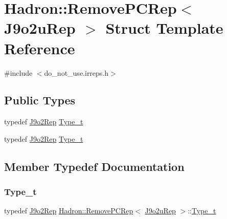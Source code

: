 \hypertarget{structHadron_1_1RemovePCRep_3_01J9o2uRep_01_4}{}\section{Hadron\+:\+:Remove\+P\+C\+Rep$<$ J9o2u\+Rep $>$ Struct Template Reference}
\label{structHadron_1_1RemovePCRep_3_01J9o2uRep_01_4}


{\ttfamily \#include $<$do\+\_\+not\+\_\+use.\+irreps.\+h$>$}

\subsection*{Public Types}
\begin{DoxyCompactItemize}
\item 
typedef \mbox{\hyperlink{structHadron_1_1J9o2Rep}{J9o2\+Rep}} \mbox{\hyperlink{structHadron_1_1RemovePCRep_3_01J9o2uRep_01_4_a572fc7879fdcb65d910768ea4cbd0dd4}{Type\+\_\+t}}
\item 
typedef \mbox{\hyperlink{structHadron_1_1J9o2Rep}{J9o2\+Rep}} \mbox{\hyperlink{structHadron_1_1RemovePCRep_3_01J9o2uRep_01_4_a572fc7879fdcb65d910768ea4cbd0dd4}{Type\+\_\+t}}
\end{DoxyCompactItemize}


\subsection{Member Typedef Documentation}
\mbox{\label{structHadron_1_1RemovePCRep_3_01J9o2uRep_01_4_a572fc7879fdcb65d910768ea4cbd0dd4}} 
\subsubsection{\texorpdfstring{Type\_t}{Type\_t}\hspace{0.1cm}{\footnotesize\ttfamily [1/2]}}
{\footnotesize\ttfamily typedef \mbox{\hyperlink{structHadron_1_1J9o2Rep}{J9o2\+Rep}} \mbox{\hyperlink{structHadron_1_1RemovePCRep}{Hadron\+::\+Remove\+P\+C\+Rep}}$<$ \mbox{\hyperlink{structHadron_1_1J9o2uRep}{J9o2u\+Rep}} $>$\+::\mbox{\hyperlink{structHadron_1_1RemovePCRep_3_01J9o2uRep_01_4_a572fc7879fdcb65d910768ea4cbd0dd4}{Type\+\_\+t}}}

